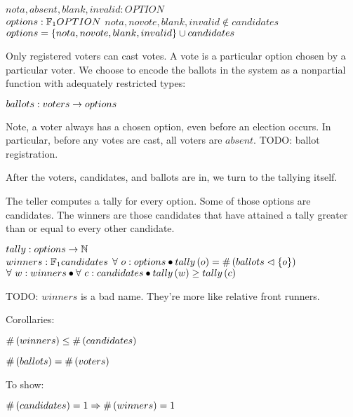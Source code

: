 \begin{axdef}
$nota, absent, blank, invalid : OPTION$ \\
$options : \finset_1 OPTION $
\where
$nota, novote, blank, invalid \notin candidates $\\
$options = \left\{{ nota, novote, blank, invalid }\right\} \cup candidates$
\end{axdef}

Only registered voters can cast votes. A vote is a particular option chosen by
a particular voter. We choose to encode the ballots in the system as a
nonpartial function with adequately restricted types:

\begin{axdef}
$ballots : voters \rightarrow options$
\end{axdef}

Note, a voter always has a chosen option, even before an election occurs. In
particular, before any votes are cast, all voters are $absent$. TODO: ballot
registration.

After the voters, candidates, and ballots are in, we turn to the tallying
itself.

The teller computes a tally for every option. Some of those options are
candidates. The winners are those candidates that have attained a tally greater
than or equal to every other candidate.

\begin{axdef}
  $tally : options \rightarrow \mathbb{N}$ \\
  $winners : \finset_1 candidates$
\where
  $\forall\ o : options \bullet tally\left({o}\right) =
    \# \left({ ballots \vartriangleleft \left\{{ o }\right\} }\right)$ \\
  $\forall\ w : winners \bullet \forall\ c : candidates
   \bullet tally\left({w}\right) \geq tally\left({c}\right)$ \\
\end{axdef}

TODO: $winners$ is a bad name. They're more like relative front runners.

Corollaries:

\begin{axdef}
$\# \left({ winners }\right) \leq \# \left({ candidates }\right)$ \\
\end{axdef}

\begin{axdef}
$\# \left({ ballots }\right) = \# \left({ voters }\right)$
\end{axdef}

To show:

\begin{axdef}
$\# \left({ candidates }\right) = 1 \Rightarrow \# \left({ winners }\right) = 1$
\end{axdef}

